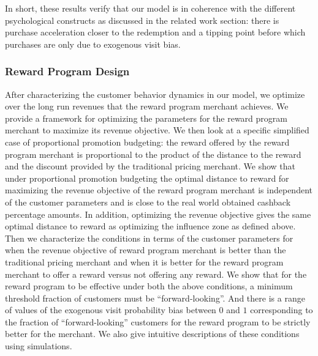 In short, these results verify that our model is in coherence with the different psychological constructs as discussed in the related work section: there is purchase acceleration closer to the redemption and a tipping point before which purchases are only due to exogenous visit bias.

\subsubsection{Reward Program Design}
After characterizing the customer behavior dynamics in our model, we optimize over the long run revenues that the reward program merchant achieves.
We provide a framework for optimizing the parameters for the reward program merchant to maximize its revenue objective.
We then look at a specific simplified case of proportional promotion budgeting: the reward offered by the reward program merchant is proportional to the product of the distance to the reward and the discount provided by the traditional pricing merchant.
We show that under proportional promotion budgeting the optimal distance to reward for maximizing the revenue objective of the reward program merchant is independent of the customer parameters and is close to the real world obtained cashback percentage amounts.
In addition, optimizing the revenue objective gives the same optimal distance to reward as optimizing the influence zone as defined above.
Then we characterize the conditions in terms of the customer parameters for when the revenue objective of reward program merchant is better than the traditional pricing merchant and when it is better for the reward program merchant to offer a reward versus not offering any reward.
We show that for the reward program to be effective under both the above conditions, a minimum threshold fraction of customers must be ``forward-looking''.
And there is a range of values of the exogenous visit probability bias between $0$ and $1$ corresponding to the fraction of ``forward-looking'' customers for the reward program to be strictly better for the merchant. 
We also give intuitive descriptions of these conditions using simulations.
